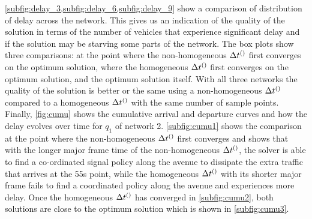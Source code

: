 \cref{subfig:delay_3,subfig:delay_6,subfig:delay_9} show a comparison of 
distribution of delay across the network. This gives us an indication of the 
quality of the solution in terms of the number of vehicles that experience significant delay and if the solution may be starving some 
parts of the network.  The box plots show three comparisons: at the point where 
the non-homogeneous $\DT[]$ first 
converges on the optimum solution, where the homogeneous $\DT[]$ first 
converges on the optimum solution, and the optimum solution itself. With all 
three networks the quality of the solution is better 
or  the same using a non-homogeneous $\DT[]$ compared to a 
homogeneous $\DT[]$ with the same number of sample points.
Finally, \cref{fig:cumu} shows the cumulative arrival and departure curves and 
how the delay evolves over time for $q_1$ of network 2. \cref{subfig:cumu1} 
shows the comparison at the point where 
the non-homogeneous $\DT[]$ first converges and shows that with the longer 
major frame time of the non-homogeneous $\DT[]$, the solver is able to find a 
co-ordinated signal policy along the 
avenue to dissipate the extra traffic that arrives at the 55s point, while the 
homogeneous $\DT[]$ with its shorter major frame fails to find a coordinated 
policy along the avenue and experiences more delay. Once the 
homogeneous $\DT[]$ has converged in \cref{subfig:cumu2}, both solutions are 
close to the optimum solution which is shown in \cref{subfig:cumu3}.

